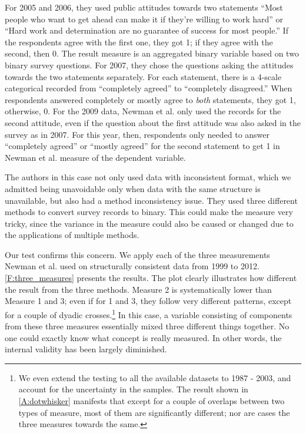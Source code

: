 For 2005 and 2006, they used public attitudes towards two statements ``Most people who want to get ahead can make it if they're willing to work hard'' or ``Hard work and determination are no guarantee of success for most people.'' If the respondents agree with the first one, they got 1; if they agree with the second, then 0. The result measure is an aggregated binary variable based on two binary survey questions. For 2007, they chose the questions asking the attitudes towards the two statements separately. For each statement, there is a 4-scale categorical recorded from ``completely agreed'' to ``completely disagreed.'' When respondents answered completely or mostly agree to \textit{both} statements, they got 1, otherwise, 0. For the 2009 data, Newman et al. only used the records for the second attitude, even if the question about the first attitude was also asked in the survey as in 2007. For this year, then, respondents only needed to answer ``completely agreed'' or ``mostly agreed'' for the second statement to get 1 in Newman et al. measure of the dependent variable. 

The authors in this case not only used data with inconsistent format, which we admitted being unavoidable only when data with the same structure is unavailable, but also had a method inconsistency issue. They used three different methods to convert survey records to binary. This could make the measure very tricky, since the variance in the measure could also be caused or changed due to the applications of multiple methods. 

Our test confirms this concern. We apply each of the three measurements Newman et al. used on structurally consistent data from 1999 to 2012. \cref{F:three_measures} presents the results. The plot clearly illustrates how different the result from the three methods. Measure 2 is systematically lower than Measure 1 and 3; even if for 1 and 3, they follow very different patterns, except for a couple of dyadic crosses.\footnote{We even extend the testing to all the available datasets to 1987 - 2003, and account for the uncertainty in the samples. The result shown in \cref{A:dotwhisker} manifests that except for a couple of overlaps between two types of measure, most of them are significantly different; nor are cases the three measures towards the same.} In this case, a variable consisting of components from these three measures essentially mixed three different things together. No one could exactly know what concept is really measured. In other words, the internal validity has been largely diminished. 


